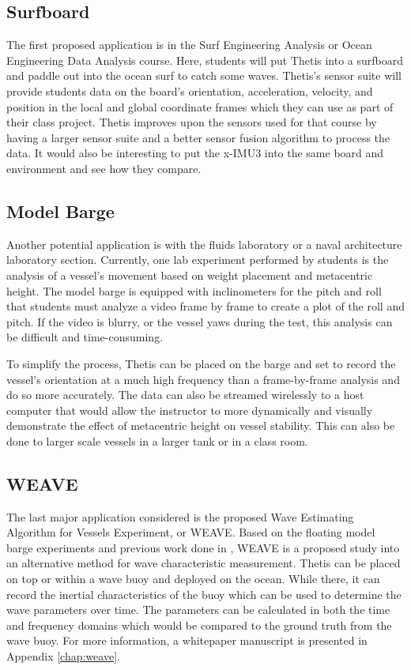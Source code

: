 \subsection{Surfboard} 
The first proposed application is in the Surf Engineering Analysis or Ocean Engineering Data Analysis course.
Here, students will put Thetis into a surfboard and paddle out into the ocean surf to catch some waves.
Thetis's sensor suite will provide students data on the board's orientation, acceleration, velocity, and position in the local and global coordinate frames which they can use as part of their class project.
Thetis improves upon the sensors used for that course by having a larger sensor suite and a better sensor fusion algorithm to process the data.
It would also be interesting to put the x-IMU3 into the same board and environment and see how they compare.

\subsection{Model Barge} 
Another potential application is with the fluids laboratory or a naval architecture laboratory section.
Currently, one lab experiment performed by students is the analysis of a vessel's movement based on weight placement and metacentric height.
The model barge is equipped with inclinometers for the pitch and roll that students must analyze a video frame by frame to create a plot of the roll and pitch.
If the video is blurry, or the vessel yaws during the test, this analysis can be difficult and time-consuming.

To simplify the process, Thetis can be placed on the barge and set to record the vessel's orientation at a much high frequency than a frame-by-frame analysis and do so more accurately.
The data can also be streamed wirelessly to a host computer that would allow the instructor to more dynamically and visually demonstrate the effect of metacentric height on vessel stability.
This can also be done to larger scale vessels in a larger tank or in a class room.

\subsection{WEAVE} 
The last major application considered is the proposed Wave Estimating Algorithm for Vessels Experiment, or WEAVE.
Based on the floating model barge experiments and previous work done in \cite{Gait-Tracking}, WEAVE is a proposed study into an alternative method for wave characteristic measurement.
Thetis can be placed on top or within a wave buoy and deployed on the ocean.
While there, it can record the inertial characteristics of the buoy which can be used to determine the wave parameters over time.
The parameters can be calculated in both the time and frequency domains which would be compared to the ground truth from the wave buoy.
For more information, a whitepaper manuscript is presented in Appendix \ref{chap:weave}.